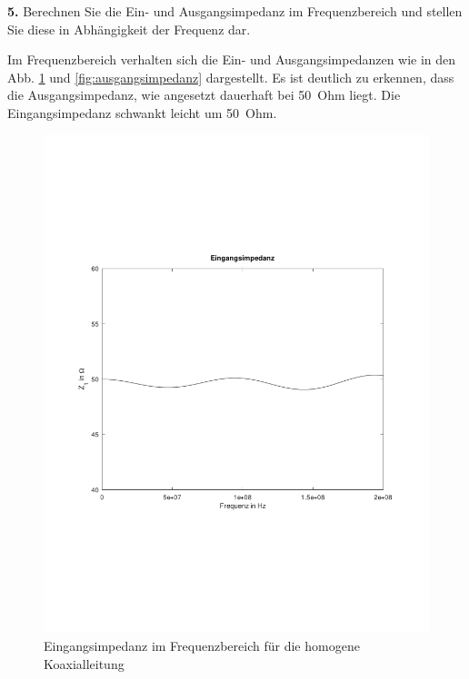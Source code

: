 \documentclass[Protokollheft.tex]{subfiles}
\begin{document}
\begin{framed}
	\noindent \textbf{5.} Berechnen Sie die Ein- und Ausgangsimpedanz im Frequenzbereich und stellen 
Sie diese in Abhängigkeit der Frequenz dar.\label{exer:ZfreqDomain}
\end{framed}
\noindent
Im Frequenzbereich verhalten sich die Ein- und Ausgangsimpedanzen wie in den Abb. \ref{fig:eingangsimpedanz} und \ref{fig:ausgangsimpedanz} dargestellt. Es ist deutlich zu erkennen, dass die Ausgangsimpedanz, wie angesetzt dauerhaft bei 50\, Ohm liegt. Die Eingangsimpedanz schwankt leicht um 50\, Ohm.
\begin{figure}
	\centering
	\includegraphics[trim = 15mm 65mm 15mm 65mm, clip,width=0.7\linewidth]{Eingangsimpedanz}
	\caption{Eingangsimpedanz im Frequenzbereich für die homogene Koaxialleitung}
	\label{fig:eingangsimpedanz}
\end{figure}
\end{document}
